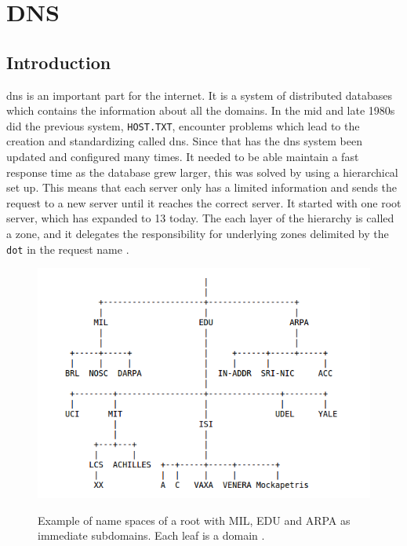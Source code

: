 \chapter{DNS}
\label{chp:dns}

\section{Introduction}

\Gls{dns} is an important part for the internet. It is a system of distributed databases which contains the information about all the domains. In the mid and late 1980s did the previous system, \texttt{HOST.TXT}, encounter problems \cite{Mockapetris:1988:DDN:52324.52338} which lead to the creation and standardizing called \Gls{dns}. Since that has the \Gls{dns} system been updated and configured many times. It needed to be able maintain a fast response time as the database grew larger, this was solved by using a hierarchical set up. This means that each server only has a limited information and sends the request to a new server until it reaches the correct server. It started with one root server, which has expanded to 13 today. The each layer of the hierarchy is called a zone, and it delegates the responsibility for underlying zones delimited by the \texttt{dot} in the request name .

\begin{figure}
\centering
\includegraphics[scale=0.5]{figs/namespace_example.png}
\label{fig:namespace}
\caption{Example of name spaces of a root with MIL, EDU and ARPA as immediate subdomains. Each leaf is a domain \citep{mockapetris1987domain}.}
\end{figure}



